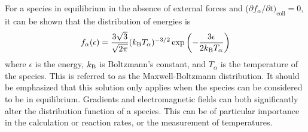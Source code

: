 For a species in equilibrium in the absence of external forces and ($\partial
f_\alpha/\partial t)_\mathrm{coll} = 0$, it can be shown that the distribution
of energies is
\begin{equation}\label{eq:mb}
  f_{\alpha}(\epsilon) = \frac{3\sqrt{3}}{\sqrt{2\pi}}(k_\mathrm{B} T_\alpha)^{-3/2}
                        \exp{\left(-\frac{3\epsilon}{2k_\mathrm{B}T_\alpha}\right)}
\end{equation}
where $\epsilon$ is the energy, $k_\mathrm{B}$ is Boltzmann's constant, and $T_\alpha$ is
the temperature of the species. This is referred to as the Maxwell-Boltzmann
distribution. It should be emphasized that this solution only applies when the
species can be considered to be in equilibrium. Gradients and electromagnetic
fields can both significantly alter the distribution function of a species. This
can be of particular importance in the calculation or reaction rates, or the
measurement of temperatures.

